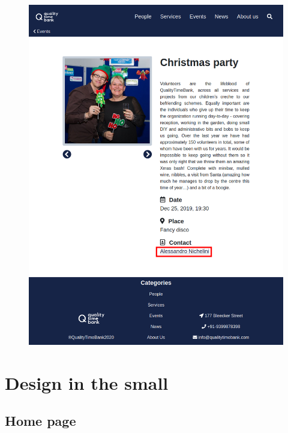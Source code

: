 \documentclass[a4paper, 11pt, parskip=half, headsepline]{scrreprt}
\begin{document}
\begin{figure}[H]
\begin{minipage}[t]{0.5\textwidth}
    	\includegraphics[width=1\linewidth, keepaspectratio]{scenarios/scenario-34}
    	\caption{}
    	\label{fig:scenario-34}
    \end{minipage}
\end{figure}

\chapter{Design in the small}

\section{Home page}
\end{document}

